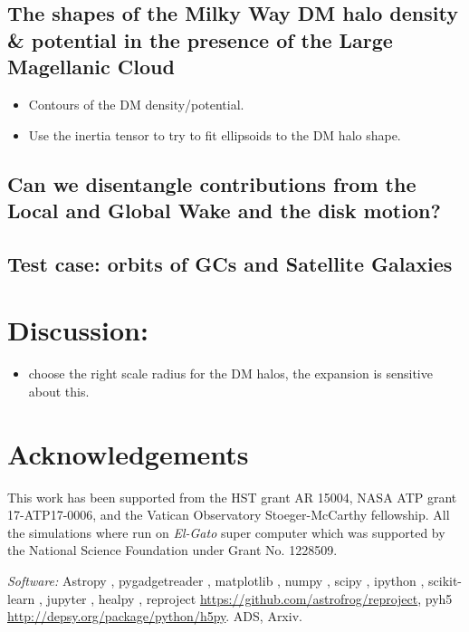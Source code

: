 \documentclass[twocolumn]{aastex62}
\begin{document}
\subsection{The shapes of the Milky Way DM halo density \& potential in the
presence of the Large Magellanic Cloud}

\begin{itemize}
  \item Contours of the DM density/potential.
  \item Use the inertia tensor to try to fit ellipsoids to the DM halo shape. 

\end{itemize}

\subsection{Can we disentangle contributions from the Local and Global Wake and the disk motion?}


\subsection{Test case: orbits of GCs and Satellite Galaxies}


\section{Discussion:}

\begin{itemize}
  \item  choose the right scale radius for the DM halos, the expansion is sensitive about this.
\end{itemize}

\section*{Acknowledgements}

This work has been supported from the HST grant AR 15004, NASA ATP grant
17-ATP17-0006, and the Vatican Observatory Stoeger-McCarthy fellowship.
All the simulations where run on \textit{El-Gato} super computer which 
was supported by the National Science Foundation under Grant No. 1228509. 



\textit{Software:} Astropy \citep{astropy:2013, astropy:2018},  pygadgetreader
\cite{pygadgetreader}, matplotlib \cite{Hunter:2007}, numpy \cite{numpy}, scipy \cite{scipy},
ipython \cite{ipython}, scikit-learn \citep{scikit-learn, sklearn_api}, jupyter
\cite{jupyter}, healpy \cite{healpy}, reproject 
\href{https://github.com/astrofrog/reproject}{https://github.com/astrofrog/reproject}, pyh5
\href{http://depsy.org/package/python/h5py}{http://depsy.org/package/python/h5py}.  ADS, Arxiv.
\end{document}
